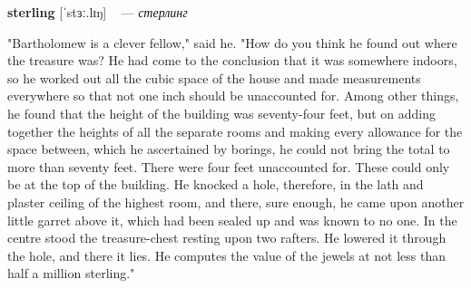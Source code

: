 \documentclass[a4paper,oneside,12pt]{amsart}
\begin{document}
{{\bf sterling } [ˈstɜː.lɪŋ] ~ --- \emph{ стерлинг }

} \vspace{6mm} {\Large 

 
"Bartholomew is a clever fellow," said he. "How do you think he found out where the treasure was? He had come to the conclusion that it was somewhere indoors, so he worked out all the cubic space of the house and made measurements everywhere so that not one inch should be unaccounted for. Among other things, he found that the height of the building was seventy-four feet, but on adding together the heights of all the separate rooms and making every allowance for the space between, which he ascertained by borings, he could not bring the total to more than seventy feet. There were four feet unaccounted for. These could only be at the top of the building. He knocked a hole, therefore, in the lath and plaster ceiling of the highest room, and there, sure enough, he came upon another little garret above it, which had been sealed up and was known to no one. In the centre stood the treasure-chest resting upon two rafters. He lowered it through the hole, and there it lies. He computes the value of the jewels at not less than half a million sterling."
\\ } 
\end{document}
